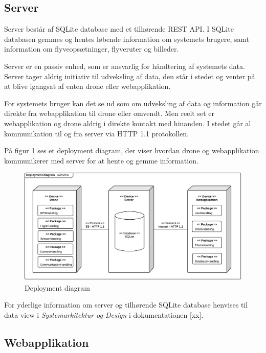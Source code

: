 \newpage 

\subsection{Server}

Server består af SQLite database med et tilhørende REST API. I SQLite databasen gemmes og hentes løbende information om systemets brugere, samt information om flyveopsætninger, flyveruter og billeder.  

Server er en passiv enhed, som er ansvarlig for håndtering af systemets data. Server tager aldrig initiativ til udveksling af data, den står i stedet og venter på at blive igangsat af enten drone eller webapplikation.

For systemets bruger kan det se ud som om udveksling af data og information går direkte fra webapplikation til drone eller omvendt. Men reelt set er webapplikation og drone aldrig i direkte kontakt med hinanden. I stedet går al kommunikation til og fra server via HTTP 1.1 protokollen. 

På figur \ref{fig:deployment_diagram} ses et deployment diagram, der viser hvordan drone og webapplikation kommunikerer med server for at hente og gemme information.

\begin{figure}[H]
\centering
\includegraphics[width=1\textwidth]{Billeder/deployment_overview.png}
\vspace{-0.5cm}
\caption{Deployment diagram}
\label{fig:deployment_diagram}
\end{figure}
 
For yderlige information om server og tilhørende SQLite database henvises til data view i \textit{Systemarkitektur og Design} i dokumentationen [xx].

\newpage


\subsection{Webapplikation}

